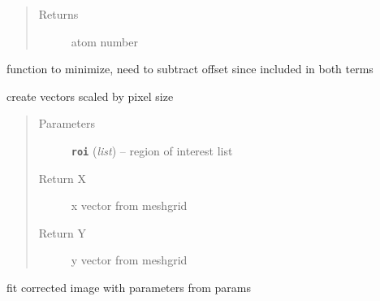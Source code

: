 \documentclass[letterpaper,10pt,english]{sphinxmanual}
\begin{document}
\begin{fulllineitems}
\begin{fulllineitems}
\begin{quote}
\begin{description}
\item[{Returns}] \leavevmode
atom number

\end{description}\end{quote}

\end{fulllineitems}


\begin{fulllineitems}
\label{fit_object:Fitobject.fit_object.bimod2min}
function to minimize, need to subtract offset since included
in both terms

\end{fulllineitems}


\begin{fulllineitems}
\label{fit_object:Fitobject.fit_object.create_vecs}
create vectors scaled by pixel size
\begin{quote}\begin{description}
\item[{Parameters}] \leavevmode
\textbf{\texttt{roi}} (\emph{list}) -- region of interest list

\item[{Return X}] \leavevmode
x vector from meshgrid

\item[{Return Y}] \leavevmode
y vector from meshgrid

\end{description}\end{quote}

\end{fulllineitems}


\begin{fulllineitems}
\label{fit_object:Fitobject.fit_object.fit_image}
fit corrected image with parameters from params

\end{fulllineitems}



\end{fulllineitems}
\end{document}
